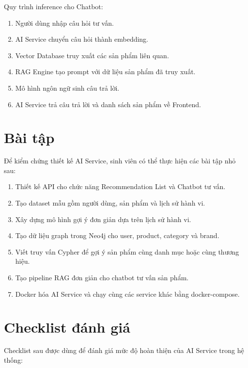\documentclass[../main.tex]{subfiles}
\begin{document}
Quy trình inference cho Chatbot:

\begin{enumerate}
    \item Người dùng nhập câu hỏi tư vấn.
    \item AI Service chuyển câu hỏi thành embedding.
    \item Vector Database truy xuất các sản phẩm liên quan.
    \item RAG Engine tạo prompt với dữ liệu sản phẩm đã truy xuất.
    \item Mô hình ngôn ngữ sinh câu trả lời.
    \item AI Service trả câu trả lời và danh sách sản phẩm về Frontend.
\end{enumerate}

\section{Bài tập}

Để kiểm chứng thiết kế AI Service, sinh viên có thể thực hiện các bài tập nhỏ sau:

\begin{enumerate}
    \item Thiết kế API cho chức năng Recommendation List và Chatbot tư vấn.
    \item Tạo dataset mẫu gồm người dùng, sản phẩm và lịch sử hành vi.
    \item Xây dựng mô hình gợi ý đơn giản dựa trên lịch sử hành vi.
    \item Tạo dữ liệu graph trong Neo4j cho user, product, category và brand.
    \item Viết truy vấn Cypher để gợi ý sản phẩm cùng danh mục hoặc cùng thương hiệu.
    \item Tạo pipeline RAG đơn giản cho chatbot tư vấn sản phẩm.
    \item Docker hóa AI Service và chạy cùng các service khác bằng docker-compose.
\end{enumerate}

\section{Checklist đánh giá}

Checklist sau được dùng để đánh giá mức độ hoàn thiện của AI Service trong hệ thống:
\end{document}
